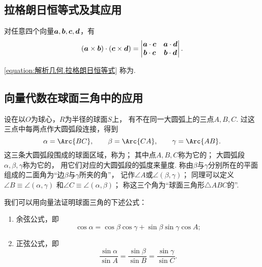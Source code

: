 \subsection{拉格朗日恒等式及其应用}
\begin{theorem}
对任意四个向量\(\boldsymbol{a},\boldsymbol{b},\boldsymbol{c},\boldsymbol{d}\)，有
\begin{equation}\label{equation:解析几何.拉格朗日恒等式}
	(\boldsymbol{a}\times\boldsymbol{b})\cdot(\boldsymbol{c}\times\boldsymbol{d})
	= \begin{vmatrix}
		\boldsymbol{a}\cdot\boldsymbol{c} & \boldsymbol{a}\cdot\boldsymbol{d} \\
		\boldsymbol{b}\cdot\boldsymbol{c} & \boldsymbol{b}\cdot\boldsymbol{d}
	\end{vmatrix}.
\end{equation}
\end{theorem}
\cref{equation:解析几何.拉格朗日恒等式}
称为.

\subsection{向量代数在球面三角中的应用}
设在以\(O\)为球心，\(R\)为半径的球面\(S\)上，
有不在同一大圆弧上的三点\(A,B,C\).
过这三点中每两点作大圆弧段连接，得到\begin{equation*}
	\alpha=\Arc{BC}, \qquad
	\beta=\Arc{CA}, \qquad
	\gamma=\Arc{AB}.
\end{equation*}
这三条大圆弧段围成的球面区域，称为；
其中点\(A,B,C\)称为它的；
大圆弧段\(\alpha,\beta,\gamma\)称为它的，
用它们对应的大圆弧段的弧度来量度.
称由\(\beta\)与\(\gamma\)分别所在的平面组成的二面角为“边\(\beta\)与\(\gamma\)所夹的角”，
记作\(\angle A\)或\(\angle(\beta,\gamma)\)；
同理可以定义\(\angle B \equiv \angle(\alpha,\gamma)\)
和\(\angle C \equiv \angle(\alpha,\beta)\)；
称这三个角为“球面三角形\(\triangle ABC\)的”.

我们可以用向量法证明球面三角的下述公式：
\begin{enumerate}
	\item 余弦公式，即\begin{equation*}
		\cos\alpha = \cos\beta \cos\gamma + \sin\beta \sin\gamma \cos A;
	\end{equation*}
	\item 正弦公式，即\begin{equation*}
		\frac{\sin\alpha}{\sin A}
		= \frac{\sin\beta}{\sin B}
		= \frac{\sin\gamma}{\sin C}.
	\end{equation*}
\end{enumerate}
